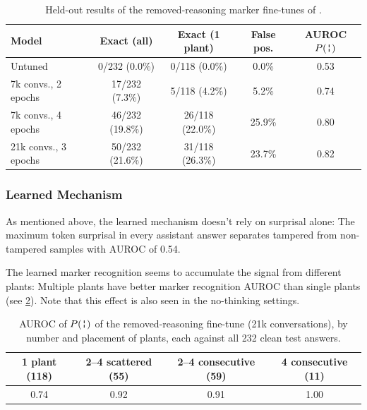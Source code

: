\begin{table}[t]
\centering
\caption{Held-out results of the removed-reasoning marker fine-tunes of \qwenB{}.}
\label{tab:hidden-marker}
\begin{tabular}{lcccc}
\toprule
Model & Exact (all) & Exact (1 plant) & False pos. & AUROC $P(\marker)$ \\
\midrule
Untuned & \phantom{0}0/232 (0.0\%) & \phantom{0}0/118 (0.0\%) & \phantom{0}0.0\% & 0.53 \\
7k convs., 2 epochs & 17/232 (7.3\%) & \phantom{0}5/118 (4.2\%) & \phantom{0}5.2\% & 0.74 \\
7k convs., 4 epochs & 46/232 (19.8\%) & 26/118 (22.0\%) & 25.9\% & 0.80 \\
21k convs., 3 epochs & 50/232 (21.6\%) & 31/118 (26.3\%) & 23.7\% & 0.82 \\
\bottomrule
\end{tabular}
\end{table}

\subsubsection{Learned Mechanism}
As mentioned above, the learned mechanism doesn't rely on surprisal alone: The maximum token surprisal in every assistant answer separates tampered from non-tampered samples with AUROC of 0.54.

The learned marker recognition seems to accumulate the signal from different plants: Multiple plants have better marker recognition AUROC than single plants (see \cref{tab:hidden-strata}). Note that this effect is also seen in the no-thinking settings.

\begin{table}[t]
\centering
\caption{AUROC of $P(\marker)$ of the removed-reasoning \qwenB{} fine-tune (21k conversations), by number and placement of plants, each against all 232 clean test answers.}
\label{tab:hidden-strata}
\begin{tabular}{cccc}
\toprule
1 plant (118) & 2--4 scattered (55) & 2--4 consecutive (59) & 4 consecutive (11) \\
\midrule
0.74 & 0.92 & 0.91 & 1.00 \\
\bottomrule
\end{tabular}
\end{table}

